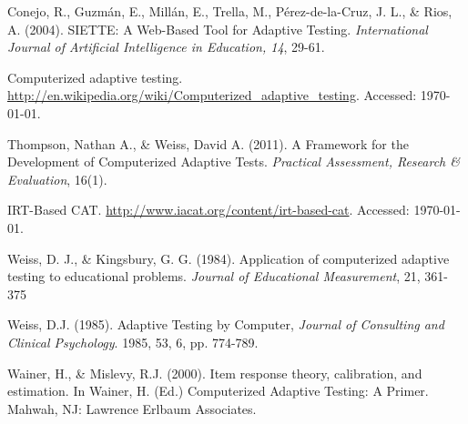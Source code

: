 \begin{thebibliography}{9}

 Conejo, R., Guzmán, E., Millán, E., Trella, M., Pérez-de-la-Cruz, J. L., \& Rios, A. (2004). SIETTE: A Web-Based Tool for Adaptive Testing. \textit{International Journal of Artificial Intelligence in Education, 14}, 29-61.

 Computerized adaptive testing. \url{http://en.wikipedia.org/wiki/Computerized_adaptive_testing}. Accessed: \today.

 Thompson, Nathan A., \& Weiss, David A. (2011). A Framework for the Development of Computerized Adaptive Tests. \textit{Practical Assessment, Research \& Evaluation}, 16(1).

 IRT-Based CAT. \url{http://www.iacat.org/content/irt-based-cat}. Accessed: \today.

 Weiss, D. J., \& Kingsbury, G. G. (1984). Application of computerized adaptive testing to educational problems. \textit{Journal of Educational Measurement}, 21, 361-375

 Weiss, D.J. (1985). Adaptive Testing by Computer, \textit{Journal of Consulting and Clinical Psychology}. 1985, 53, 6, pp. 774-789.

 Wainer, H., \& Mislevy, R.J. (2000). Item response theory, calibration, and estimation. In Wainer, H. (Ed.) Computerized Adaptive Testing: A Primer. Mahwah, NJ: Lawrence Erlbaum Associates.




\end{thebibliography}